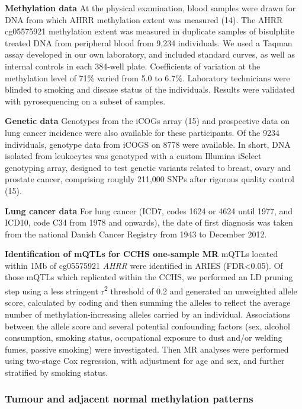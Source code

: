 \documentclass[11pt,twoside]{bristolthesis}
\begin{document}
\textbf{Methylation data}
At the physical examination, blood samples were drawn for DNA from which AHRR methylation extent was measured (14). The AHRR cg05575921 methylation extent was measured in duplicate samples of bisulphite treated DNA from peripheral blood from 9,234 individuals. We used a Taqman assay developed in our own laboratory, and included standard curves, as well as internal controls in each 384-well plate. Coefficients of variation at the methylation level of 71\% varied from 5.0 to 6.7\%. Laboratory technicians were blinded to smoking and disease status of the individuals. Results were validated with pyrosequencing on a subset of samples.

\textbf{Genetic data}
Genotypes from the iCOGs array (15) and prospective data on lung cancer incidence were also available for these participants. Of the 9234 individuals, genotype data from iCOGS on 8778 were available. In short, DNA isolated from leukocytes was genotyped with a custom Illumina iSelect genotyping array, designed to test genetic variants related to breast, ovary and prostate cancer, comprising roughly 211,000 SNPs after rigorous quality control (15).

\textbf{Lung cancer data}
For lung cancer (ICD7, codes 1624 or 4624 until 1977, and ICD10, code C34 from 1978 and onwards), the date of first diagnosis was taken from the national Danish Cancer Registry from 1943 to December 2012.

\textbf{Identification of mQTLs for CCHS one-sample MR}
mQTLs located within 1Mb of cg05575921 \emph{AHRR} were identified in ARIES (FDR\textless0.05). Of those mQTLs which replicated within the CCHS, we performed an LD pruning step using a less stringent r\textsuperscript{2} threshold of 0.2 and generated an unweighted allele score, calculated by coding and then summing the alleles to reflect the average number of methylation-increasing alleles carried by an individual. Associations between the allele score and several potential confounding factors (sex, alcohol consumption, smoking status, occupational exposure to dust and/or welding fumes, passive smoking) were investigated. Then MR analyses were performed using two-stage Cox regression, with adjustment for age and sex, and further stratified by smoking status.

\hypertarget{tumour-and-adjacent-normal-methylation-patterns}{%
\subsubsection{Tumour and adjacent normal methylation patterns}\label{tumour-and-adjacent-normal-methylation-patterns}}
\end{document}
